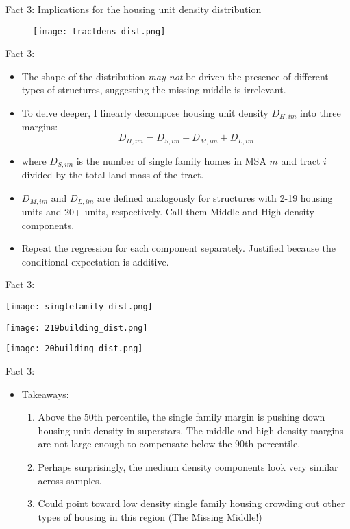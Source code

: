\documentclass{beamer}
\theoremstyle{plain}
\begin{document}
\begin{frame}{Fact 3: Implications for the housing unit density distribution}
	\begin{figure}
		\texttt{[image: tractdens\_dist.png]}
	\end{figure}

\end{frame}


\begin{frame}{Fact 3:}
\begin{itemize}
	\color{black}
	\item The shape of the distribution \textit{may not} be driven the presence of different types of structures, suggesting the missing middle is irrelevant. 
	\item To delve deeper, I linearly decompose housing unit density $D_{H, im}$ into three margins:
	\begin{equation}
		D_{H, im} = D_{S, im} + D_{M, im} + D_{L, im}
	\end{equation}
\item where $D_{S, im}$ is the number of single family homes in MSA $m$ and tract $i$ divided by the total land mass of the tract. 
\item $D_{M, im}$ and $D_{L, im}$ are defined analogously for structures with 2-19 housing units and 20+ units, respectively. Call them Middle and High density components. 
\item \color{red} Repeat \color{black} the regression for each component separately. Justified because the conditional expectation is additive.
\end{itemize}	
\end{frame}

\begin{frame}{Fact 3:}
	\centerline{	\texttt{[image: singlefamily\_dist.png]}}
\centerline{	
	\texttt{[image: 219building\_dist.png]}}
\centerline{	
	\texttt{[image: 20building\_dist.png]}}
\end{frame}

\begin{frame}{Fact 3:}
\begin{itemize}
	\color{black}
	\item Takeaways: 
	\begin{enumerate}
		\itemsep1em
		\item Above the 50th percentile, the single family margin is pushing down housing unit density in superstars. The middle and high density margins are not large enough to compensate below the 90th percentile.
		\item Perhaps surprisingly, the medium density components look very similar across samples. 
		\item Could point toward low density single family housing crowding out other types of housing in this region (The Missing Middle!)
	\end{enumerate}
\end{itemize}	
\end{frame}
\end{document}
